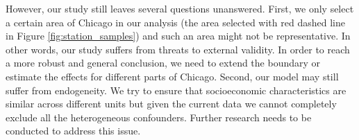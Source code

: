 \documentclass[a4paper, 11pt]{article}
\begin{document}
However, our study still leaves several questions unanswered. First, we only select a certain area of Chicago in our analysis (the area selected with red dashed line in Figure \ref{fig:station_samples}) and such an area might not be representative. In other words, our study suffers from threats to external validity. In order to reach a more robust and general conclusion, we need to extend the boundary or estimate the effects for different parts of Chicago. Second, our model may still suffer from endogeneity. We try to ensure that socioeconomic characteristics are similar across different units but given the current data we cannot completely exclude all the heterogeneous confounders. Further research needs to be conducted to address this issue.

\clearpage

\nocite{*}



\newpage

\appendix
\end{document}
